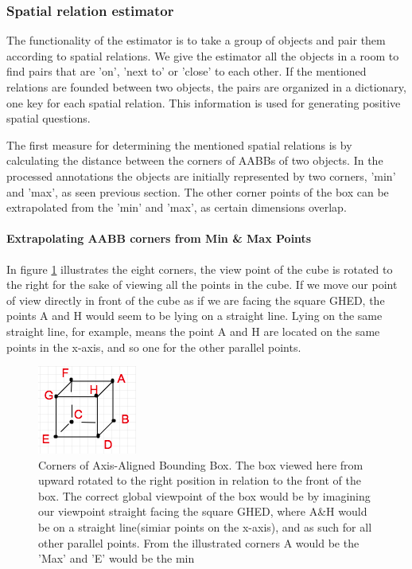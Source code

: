 \subsubsection{Spatial relation estimator}

The functionality of the estimator is to take a group of objects and pair them according to spatial relations. We give the estimator all the objects in a room to find pairs that are 'on', 'next to' or 'close' to each other. If the mentioned relations are founded between two objects, the pairs are organized in a dictionary, one key for each spatial relation. This information is used for generating positive spatial questions. 

The first measure for determining the mentioned spatial relations is by calculating the distance between the corners of AABBs of two objects. In the processed annotations the objects are initially represented by two corners, 'min' and 'max', as seen  previous section. The other corner points of the box can be extrapolated from the 'min' and 'max', as certain dimensions overlap. 

\paragraph{Extrapolating AABB corners from Min \& Max Points}

In figure \ref{fig:box_points} illustrates the eight corners, the view point of the cube is rotated to the right for the sake of viewing all the points in the cube. If we move our point of view directly in front of the cube as if  we are facing the square GHED,  the points A and H would seem to be lying on a straight line. Lying on the same straight line, for example, means the point A and H are located on the same points in the x-axis, and so one for the other parallel points. 


\begin{figure}[H]
\centering
\includegraphics{images/cornerPoints.png} %
\caption{Corners of Axis-Aligned Bounding Box. The box viewed here from upward rotated to the right position in relation to the front of the box. The correct global viewpoint of the box would be by imagining our viewpoint straight facing the square GHED, where A\&H would be on a straight line(simiar points on the x-axis), and as such for all other parallel points. From the illustrated corners A would be the 'Max' and 'E' would be the min}
\label{fig:box_points}
\end{figure} 

